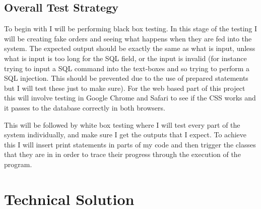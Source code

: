 \documentclass[
11pt, %
a4paper, %
oneside, %
headinclude,footinclude, %
BCOR5mm, %
]{scrartcl}
\begin{document}
\subsection{Overall Test Strategy}
To begin with I will be performing black box testing. In this stage of the testing I will be creating fake orders and seeing what happens when they are fed into the system. The expected output should be exactly the same as what is input, unless what is input is too long for the SQL field, or the input is invalid (for instance trying to input a SQL command into the text-boxes and so trying to perform a SQL injection. This should be prevented due to the use of prepared statements but I will test these just to make sure). For the web based part of this project this will involve testing in Google Chrome and Safari to see if the CSS works and it passes to the database correctly in both browsers.\par This will be followed by white box testing where I will test every part of the system individually, and make sure I get the outputs that I expect. To achieve this I will insert print statements in parts of my code and then trigger the classes that they are in in order to trace their progress through the execution of the program. 





\section{Technical Solution}
\end{document}
